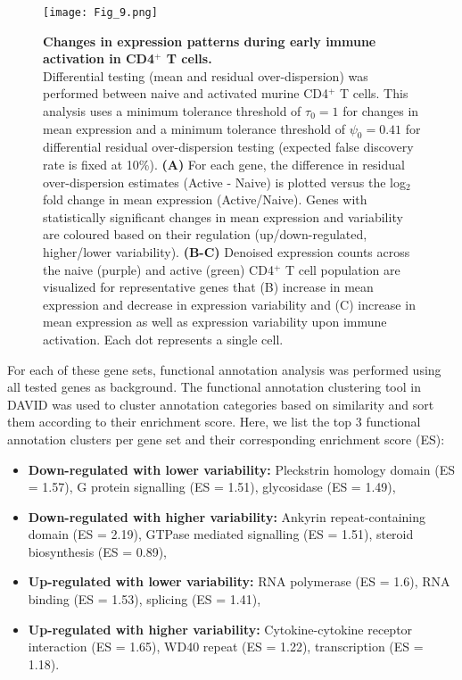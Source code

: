 \newpage

\begin{figure}[!h]
\centering
\texttt{[image: Fig\_9.png]}
\caption{\textbf{Changes in expression patterns during early immune activation in CD4$^+$ T cells.}\\
Differential testing (mean and residual over-dispersion) was performed between naive and activated murine CD4$^+$ T cells. This analysis uses a minimum tolerance threshold of $\tau_0=1$ for changes in mean expression and a minimum tolerance threshold of $\psi_0=0.41$ for differential residual over-dispersion testing (expected false discovery rate is fixed at 10\%). \textbf{(A)} For each gene, the difference in residual over-dispersion estimates (Active - Naive) is plotted versus the log$_2$ fold change in mean expression (Active/Naive). Genes with statistically significant changes in mean expression and variability are coloured based on their regulation (up/down-regulated, higher/lower variability).  \textbf{(B-C)} Denoised expression counts across the naive (purple) and active (green) CD4$^+$ T cell population are visualized for representative genes that (B) increase in mean expression and decrease in expression variability and (C) increase in mean expression as well as expression variability  upon immune activation. Each dot represents a single cell.}
\label{fig2:immune_activation}
\end{figure}

\newpage

For each of these gene sets, functional annotation analysis was performed using all tested genes as background. The functional annotation clustering tool in DAVID \citep{Dennis2003} was used to cluster annotation categories based on similarity and sort them according to their enrichment score. Here, we  list the top 3 functional annotation clusters per gene set and their corresponding enrichment score (ES):
\begin{itemize}
\item \textbf{Down-regulated with lower variability:} Pleckstrin homology domain (ES = 1.57), G protein signalling (ES = 1.51), glycosidase (ES = 1.49),
\item \textbf{Down-regulated with higher variability:} Ankyrin repeat-containing domain (ES = 2.19), GTPase mediated signalling (ES = 1.51), steroid biosynthesis (ES = 0.89), 
\item \textbf{Up-regulated with lower variability:} RNA polymerase (ES = 1.6), RNA binding (ES = 1.53), splicing (ES = 1.41),
\item \textbf{Up-regulated with higher variability:} Cytokine-cytokine receptor interaction (ES = 1.65), WD40 repeat (ES = 1.22), transcription (ES = 1.18).
\end{itemize}

